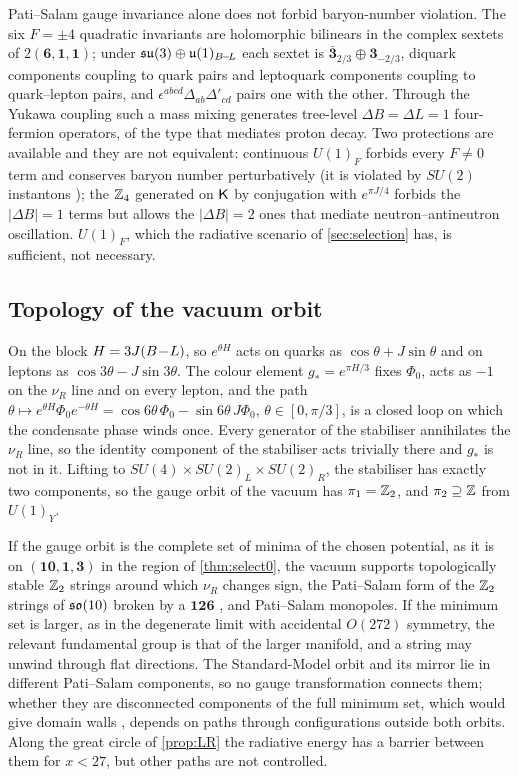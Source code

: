 Pati--Salam gauge invariance alone does not forbid baryon-number violation. The six $F=\pm4$ quadratic invariants are holomorphic bilinears in the complex sextets
of $2(\mathbf6,\mathbf1,\mathbf1)$; under $\mathfrak{su}(3)\oplus\mathfrak{u}(1)_{B\!-\!L}$ each sextet is $\bar{\mathbf3}_{2/3}\oplus\mathbf3_{-2/3}$, diquark components coupling to quark pairs and leptoquark
components coupling to quark--lepton pairs, and $\epsilon^{abcd}\Delta_{ab}\Delta'_{cd}$ pairs one with the other. Through the Yukawa coupling such a mass mixing generates
tree-level $\Delta B=\Delta L=1$ four-fermion operators, of the type that mediates proton decay. Two protections are available and they are not equivalent: continuous
$U(1)_F$ forbids every $F\neq0$ term and conserves baryon number perturbatively (it is violated by $SU(2)$ instantons \cite{tHooft76}); the $\mathbb{Z}_4$ generated on $\mathsf K$ by
conjugation with $e^{\pi J/4}$ forbids the $|\Delta B|=1$ terms but allows the $|\Delta B|=2$ ones that mediate neutron--antineutron oscillation. $U(1)_F$, which the
radiative scenario of \cref{sec:selection} has, is sufficient, not necessary.

\subsection{Topology of the vacuum orbit}

\begin{theorem}[$\Z_2$ strings]
\label{thm:strings}
On the block $H=3J(B\!-\!L)$, so $e^{\theta H}$ acts on quarks as $\cos\theta+J\sin\theta$ and on leptons as $\cos3\theta-J\sin3\theta$. The colour element $g_*=e^{\pi H/3}$ fixes
$\Phi_0$, acts as $-1$ on the $\nu_R$ line and on every lepton, and the path $\theta\mapsto e^{\theta H}\Phi_0e^{-\theta H}=\cos6\theta\,\Phi_0-\sin6\theta\,J\Phi_0$,
$\theta\in[0,\pi/3]$, is a closed loop on which the condensate phase winds once. Every generator of the stabiliser annihilates the $\nu_R$ line, so the identity component
of the stabiliser acts trivially there and $g_*$ is not in it. Lifting to $SU(4)\times SU(2)_L\times SU(2)_R$, the stabiliser has exactly two components, so the gauge orbit of
the vacuum has $\pi_1=\mathbb{Z}_2$, and $\pi_2\supseteq\mathbb{Z}$ from $U(1)_Y$.
\end{theorem}

If the gauge orbit is the complete set of minima of the chosen potential, as it is on $(\mathbf{10},\mathbf1,\mathbf3)$ in the region of \cref{thm:select0}, the vacuum supports
topologically stable $\Z_2$ strings around which $\nu_R$ changes sign, the Pati--Salam form of the $\Z_2$ strings of $\mathfrak{so}(10)$ broken by a $\mathbf{126}$ \cite{KibbleLazaridesShafi82},
and Pati--Salam monopoles. If the minimum set is larger, as in the degenerate limit with accidental $O(272)$ symmetry, the relevant fundamental group is that of the
larger manifold, and a string may unwind through flat directions. The Standard-Model orbit and its mirror lie in different Pati--Salam components, so no gauge
transformation connects them; whether they are disconnected components of the full minimum set, which would give domain walls \cite{ZeldovichKobzarevOkun75},
depends on paths through configurations outside both orbits. Along the great circle of \cref{prop:LR} the radiative energy has a barrier between them for $x<27$,
but other paths are not controlled.
